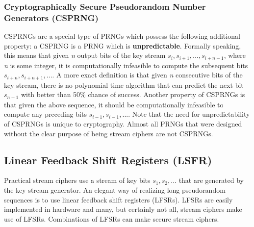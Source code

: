 \documentclass[11pt, a4paper]{article}
\begin{document}
\subsubsection{Cryptographically Secure Pseudorandom Number Generators (CSPRNG)}
CSPRNGs are a special type of PRNGs which possess the following additional property: a CSPRNG is a PRNG which is \textbf{unpredictable}. Formally speaking, this means that given \textit{n} output bits of the key stream $s_i,s_{i+1},...,s_{i+n-1}$, where \textit{n} is some integer, it is computationally infeasible to compute the subsequent bits $s_{i+n},s_{i+n+1},...$. A more exact definition is that given \textit{n} consecutive bits of the key stream, there is no polynomial time algorithm that can predict the next bit $s_{n+1}$ with better than 50\% chance of success. Another property of CSPRNGs is that given the above sequence, it should be computationally infeasible to compute any preceding bits $s_{i-1},s_{i-1},...$. Note that the need for unpredictability of CSPRNGs is unique to cryptography. Almost all PRNGs that were designed without the clear purpose of being stream ciphers are not CSPRNGs.

\newpage
\subsection{Linear Feedback Shift Registers (LSFR)}
Practical stream ciphers use a stream of key bits $s_1,s_2,...$ that are generated by the key stream generator. An elegant way of realizing long pseudorandom sequences is to use linear feedback shift registers (LFSRs). LFSRs are easily implemented in hardware and many, but certainly not all, stream ciphers make use of LFSRs. Combinations of LFSRs can make secure stream ciphers.\\
\end{document}
